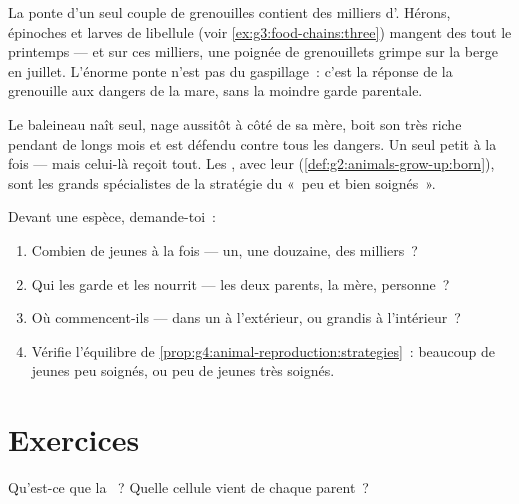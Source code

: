 \begin{example}\label{ex:g4:animal-reproduction:pondcount}
La ponte d'un seul couple de grenouilles contient des milliers
d'. Hérons, épinoches et larves de libellule (voir
\cref{ex:g3:food-chains:three}) mangent des  tout le
printemps --- et sur ces milliers, une poignée de grenouillets
grimpe sur la berge en juillet. L'énorme ponte n'est pas du
gaspillage~: c'est la réponse de la grenouille aux dangers de la
mare, sans la moindre garde parentale.
\end{example}

\begin{example}\label{ex:g4:animal-reproduction:whalecalf}
Le baleineau naît seul, nage aussitôt à côté de sa mère, boit son
 très riche pendant de longs mois et est défendu contre tous les
dangers. Un seul petit à la fois --- mais celui-là reçoit tout. Les
, avec leur 
(\cref{def:g2:animals-grow-up:born}), sont les grands spécialistes
de la stratégie du «~peu et bien soignés~».
\end{example}

\begin{method}\label{met:g4:animal-reproduction:read}
Devant une espèce, demande-toi~:
\begin{enumerate}
  \item Combien de jeunes à la fois --- un, une douzaine, des
        milliers~?
  \item Qui les garde et les nourrit --- les deux parents, la mère,
        personne~?
  \item Où commencent-ils --- dans un  à l'extérieur, ou
        grandis à l'intérieur~?
  \item Vérifie l'équilibre de
        \cref{prop:g4:animal-reproduction:strategies}~: beaucoup de
        jeunes peu soignés, ou peu de jeunes très soignés.
\end{enumerate}
\end{method}

\section{Exercices}

\begin{exercise}[$\star$]\label{exo:g4:animal-reproduction:1}
Qu'est-ce que la ~? Quelle cellule vient de chaque
parent~?
\end{exercise}


